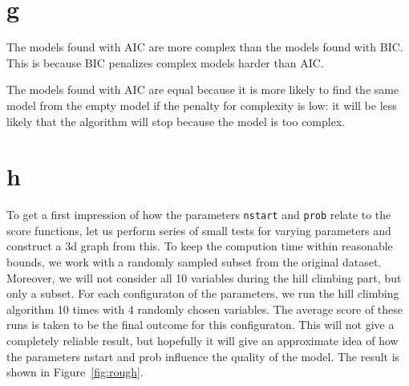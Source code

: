 \documentclass[12pt]{article}
\theoremstyle{definition}
\begin{document}





\section*{g}
The models found with AIC are more complex than the models found with BIC.
This is because BIC penalizes complex models harder than AIC.

The models found with AIC are equal because it is more likely to find the
same model from the empty model if the penalty for complexity is low: it will
be less likely that the algorithm will stop because the model is too complex.

\section*{h}
To get a first impression of how the parameters \texttt{nstart} and \texttt{prob} relate to the score functions,
let us perform series of small tests for varying parameters and construct a 3d graph from this.
To keep the compution time within reasonable bounds, we work with a randomly sampled subset
from the original dataset.
Moreover, we will not consider all 10 variables during the hill climbing part, but only a subset.
For each configuraton of the parameters, we run the hill climbing algorithm 10 times with 4
randomly chosen variables.
The average score of these runs is taken to be the final outcome for this configuraton.
This will not give a completely reliable result, but hopefully it will give an approximate
idea of how the parameters nstart and prob influence the quality of the model.
The result is shown in Figure~\ref{fig:rough}.
\end{document}
